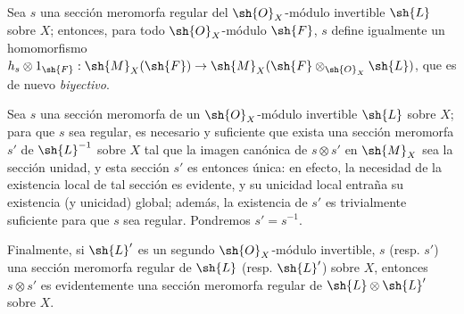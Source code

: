 \begin{env}[20.1.9]
\label{IV.20.1.9}
Sea $s$ una sección meromorfa regular del $\sh{O}_X$-módulo invertible $\sh{L}$ sobre $X$; entonces, para todo $\sh{O}_X$-módulo $\sh{F}$, $s$ define igualmente un homomorfismo $h_s\otimes1_{\sh{F}}:\sh{M}_X(\sh{F})\to\sh{M}_X(\sh{F}\otimes_{\sh{O}_X}\sh{L})$, que es de nuevo \emph{biyectivo}.
\end{env}

\begin{env}[20.1.10]
\label{IV.20.1.10}
Sea $s$ una sección meromorfa de un $\sh{O}_X$-módulo invertible $\sh{L}$ sobre $X$; para que $s$ sea regular, es necesario y suficiente que exista una sección meromorfa $s'$ de $\sh{L}^{-1}$ sobre $X$ tal que la imagen canónica de $s\otimes s'$ en $\sh{M}_X$  sea la sección unidad, y esta sección $s'$ es entonces única: en efecto, la necesidad de la existencia local de tal sección es evidente, y su unicidad local entraña su existencia (y unicidad) global; además, la existencia de $s'$ es trivialmente suficiente para que $s$ sea regular.
Pondremos $s'=s^{-1}$.

Finalmente, si $\sh{L}'$ es un segundo $\sh{O}_X$-módulo invertible, $s$ (resp. $s'$) una sección meromorfa regular de $\sh{L}$ (resp. $\sh{L}'$) sobre $X$, entonces $s\otimes s'$ es evidentemente una sección meromorfa regular de $\sh{L}\otimes\sh{L}'$ sobre $X$.
\end{env}

